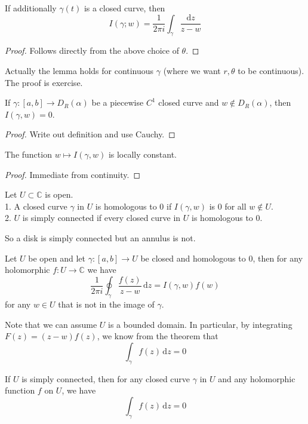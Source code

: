 \begin{corollary}
    If additionally $\gamma(t)$ is a closed curve, then
    $$I(\gamma;w)=\frac{1}{2\pi i}\int_\gamma\frac{\mathrm dz}{z-w}$$
\end{corollary}
\begin{proof}
    Follows directly from the above choice of $\theta$.
\end{proof}
\begin{remark}
    Actually the lemma holds for continuous $\gamma$ (where we want $r,\theta$ to be continuous).
    The proof is exercise.
\end{remark}
\begin{proposition}
    If $\gamma:[a,b]\to D_R(\alpha)$ be a piecewise $C^1$ closed curve and $w\notin D_R(\alpha)$, then $I(\gamma,w)=0$.
\end{proposition}
\begin{proof}
    Write out definition and use Cauchy.
\end{proof}
\begin{proposition}
    The function $w\mapsto I(\gamma,w)$ is locally constant.
\end{proposition}
\begin{proof}
    Immediate from continuity.
\end{proof}
\begin{definition}
    Let $U\subset\mathbb C$ is open.\\
    1. A closed curve $\gamma$ in $U$ is homologous to $0$ if $I(\gamma,w)$ is $0$ for all $w\notin U$.\\
    2. $U$ is simply connected if every closed curve in $U$ is homologous to $0$.
\end{definition}
So a disk is simply connected but an annulus is not.
\begin{theorem}\label{general_cif}
    Let $U$ be open and let $\gamma:[a,b]\to U$ be closed and homologous to $0$, then for any holomorphic $f:U\to\mathbb C$ we have
    $$\frac{1}{2\pi i}\oint_\gamma\frac{f(z)}{z-w}\,\mathrm dz=I(\gamma,w)f(w)$$
    for any $w\in U$ that is not in the image of $\gamma$.
\end{theorem}
Note that we can assume $U$ is a bounded domain.
In particular, by integrating $F(z)=(z-w)f(z)$, we know from the theorem that
$$\int_\gamma f(z)\,\mathrm dz=0$$
\begin{corollary}
    If $U$ is simply connected, then for any closed curve $\gamma$ in $U$ and any holomorphic function $f$ on $U$, we have
    $$\int_\gamma f(z)\,\mathrm dz=0$$
\end{corollary}
